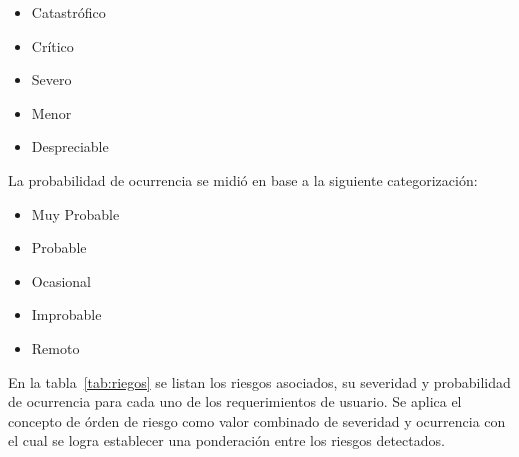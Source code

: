 		\begin{itemize}
		  \item Catastrófico
		  \item Crítico	
		  \item Severo	
		  \item Menor	
		  \item Despreciable 
		\end{itemize}
	
		La probabilidad de ocurrencia se midió en base a la siguiente categorización:
	
		\begin{itemize}
		  \item Muy Probable
		  \item Probable	
		  \item Ocasional
		  \item Improbable 	
		  \item Remoto
		\end{itemize}
		
		En la tabla~\ref {tab:riegos} se listan los riesgos asociados, su severidad y probabilidad de ocurrencia para cada uno de los
		requerimientos de usuario. Se aplica el concepto de órden de riesgo como valor combinado de severidad y ocurrencia con el cual se logra establecer
		una ponderación entre los riesgos detectados.
		
		\newpage
		
